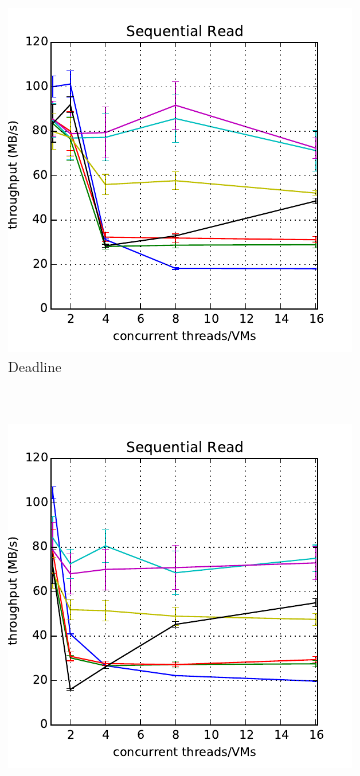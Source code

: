 \documentclass{acmsig}
\begin{document}
\begin{figure}[t]
\begin{subfigure}[b]{0.3\textwidth}
     \includegraphics[width=\textwidth]{figures/throughput_deadline_read.pdf}
     \caption{Deadline}
     \label{fig:aggthroughput_dealine_read}
   \end{subfigure}
    ~ %
   \begin{subfigure}[b]{0.3\textwidth}
     \includegraphics[width=\textwidth]{figures/throughput_noop_read.pdf}

\end{subfigure}
\end{figure}
\end{document}
